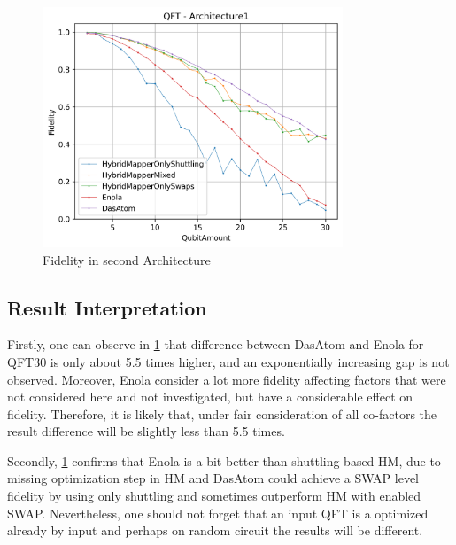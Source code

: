 \begin{figure}[htbp]
  \centering
    \includegraphics[width=0.8\textwidth]{figures/FidelityArch2.png}
    \caption[Fidelity in second Architecture]{Fidelity in second Architecture}
    \label{fig:FidelityArch2}
\end{figure}

\subsection{Result Interpretation}
Firstly, one can observe in \ref{fig:FidelityArch2} that difference between DasAtom and Enola for \ac{QFT}30 is only about 5.5 times higher,
and an exponentially increasing gap is not observed.
Moreover, Enola consider a lot more fidelity affecting factors that were not considered here and not investigated, 
but have a considerable effect on fidelity. 
Therefore, it is likely that, under fair consideration of all co-factors the result difference will be slightly less than 5.5 times.

Secondly, \ref{fig:FidelityArch2} confirms that Enola is a bit better than shuttling based \ac{HM}, due to missing optimization step in \ac{HM}
and DasAtom could achieve a SWAP level fidelity by using only shuttling and sometimes outperform \ac{HM} with enabled SWAP.
Nevertheless, one should not forget that an input QFT is a optimized already by input and perhaps on random circuit the results will be different.
